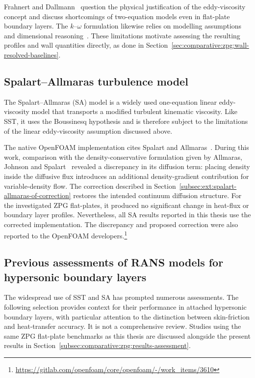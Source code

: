 Frahnert and Dallmann~\cite{frahnert2002examination} question the physical justification of the eddy-viscosity concept and discuss shortcomings of two-equation models even in flat-plate boundary layers. The \(k\)--\(\omega\) formulation likewise relies on modelling assumptions and dimensional reasoning~\cite[Section~4.3.1]{wilcox1998turbulence}. These limitations motivate assessing the resulting profiles and wall quantities directly, as done in Section~\ref{sec:comparative:zpg:wall-resolved-baselines}.

\subsection{Spalart--Allmaras turbulence model}

The Spalart--Allmaras (SA) model is a widely used one-equation linear eddy-viscosity model that transports a modified turbulent kinematic viscosity. Like SST, it uses the Boussinesq hypothesis and is therefore subject to the limitations of the linear eddy-viscosity assumption discussed above.
\par\medskip

The native OpenFOAM implementation cites Spalart and Allmaras~\cite{SpalartAllmaras1994}. During this work, comparison with the density-conservative formulation given by Allmaras, Johnson and Spalart~\cite{AJS2012} revealed a discrepancy in its diffusion term: placing density inside the diffusive flux introduces an additional density-gradient contribution for variable-density flow. The correction described in Section~\ref{subsec:ext:spalart-allmaras-of-correction} restores the intended continuum diffusion structure. For the investigated ZPG flat-plates, it produced no significant change in heat-flux or boundary layer profiles. Nevertheless, all SA results reported in this thesis use the corrected implementation. The discrepancy and proposed correction were also reported to the OpenFOAM developers.\footnote{\url{https://gitlab.com/openfoam/core/openfoam/-/work_items/3610}}

\subsection{Previous assessments of RANS models for hypersonic boundary layers}

The widespread use of SST and SA has prompted numerous assessments. The following selection provides context for their performance in attached hypersonic boundary layers, with particular attention to the distinction between skin-friction and heat-transfer accuracy. It is not a comprehensive review. Studies using the same ZPG flat-plate benchmarks as this thesis are discussed alongside the present results in Section~\ref{subsec:comparative:zpg:results-assessment}.
\par\medskip

